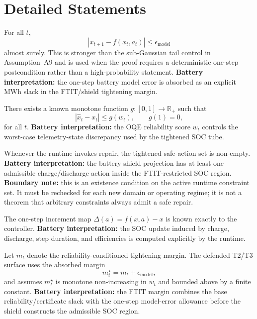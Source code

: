 \section{Detailed Statements}

\begin{assumption}\label{assum:A1}
For all $t$,
\[
  |x_{t+1} - f(x_t,a_t)| \le \epsilon_{\mathrm{model}}
\]
almost surely.  This is stronger than the sub-Gaussian tail control in
Assumption~A9 and is used when the proof requires a deterministic one-step
postcondition rather than a high-probability statement.
\textbf{Battery interpretation:} the one-step battery model error is absorbed
as an explicit MWh slack in the FTIT/shield tightening margin.
\end{assumption}

\begin{assumption}\label{assum:A2}
There exists a known monotone function $g\colon[0,1]\to\mathbb{R}_+$ such that
\[
  |\hat{x}_t - x_t| \le g(w_t), \qquad g(1)=0,
\]
for all $t$.
\textbf{Battery interpretation:} the OQE reliability score $w_t$ controls the
worst-case telemetry-state discrepancy used by the tightened SOC tube.
\end{assumption}

\begin{assumption}\label{assum:A3}
Whenever the runtime invokes repair, the tightened safe-action set is non-empty.
\textbf{Battery interpretation:} the battery shield projection has at least one
admissible charge/discharge action inside the FTIT-restricted SOC region.
\textbf{Boundary note:} this is an existence condition on the active runtime
constraint set.  It must be rechecked for each new domain or operating regime;
it is not a theorem that arbitrary constraints always admit a safe repair.
\end{assumption}

\begin{assumption}\label{assum:A4}
The one-step increment map $\Delta(a)=f(x,a)-x$ is known exactly to the
controller.
\textbf{Battery interpretation:} the SOC update induced by charge, discharge,
step duration, and efficiencies is computed explicitly by the runtime.
\end{assumption}

\begin{assumption}\label{assum:A5}
Let $m_t$ denote the reliability-conditioned tightening margin.  The defended
T2/T3 surface uses the absorbed margin
\[
  m_t^\star = m_t + \epsilon_{\mathrm{model}},
\]
and assumes $m_t^\star$ is monotone non-increasing in $w_t$ and bounded above
by a finite constant.
\textbf{Battery interpretation:} the FTIT margin combines the base
reliability/certificate slack with the one-step model-error allowance before
the shield constructs the admissible SOC region.
\end{assumption}

